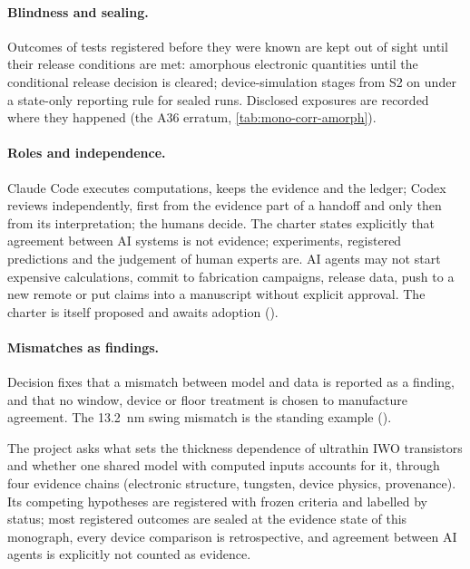 \paragraph{Blindness and sealing.} Outcomes of tests registered before they were known are kept out of sight until their
release conditions are met: amorphous electronic quantities until the conditional release decision  is
cleared; device-simulation stages from S2 on under a state-only reporting rule for sealed runs. Disclosed exposures are
recorded where they happened (the A36 erratum, \cref{tab:mono-corr-amorph}).

\paragraph{Roles and independence.} Claude Code executes computations, keeps the evidence and the ledger; Codex reviews
independently, first from the evidence part of a handoff and only then from its interpretation; the humans decide. The
charter states explicitly that agreement between AI systems is not evidence; experiments, registered predictions and the
judgement of human experts are. AI agents may not start expensive calculations, commit to fabrication campaigns, release
data, push to a new remote or put claims into a manuscript without explicit approval. The charter is itself proposed and
awaits adoption ().

\paragraph{Mismatches as findings.} Decision  fixes that a mismatch between model and data is reported as a
finding, and that no window, device or floor treatment is chosen to manufacture agreement. The 13.2~nm swing mismatch is
the standing example ().

\begin{keyresult}
The project asks what sets the thickness dependence of ultrathin IWO transistors and whether one shared model with
computed inputs accounts for it, through four evidence chains (electronic structure, tungsten, device physics,
provenance). Its competing hypotheses are registered with frozen criteria and labelled by status; most registered
outcomes are sealed at the evidence state of this monograph, every device comparison is retrospective, and agreement
between AI agents is explicitly not counted as evidence.
\end{keyresult}
